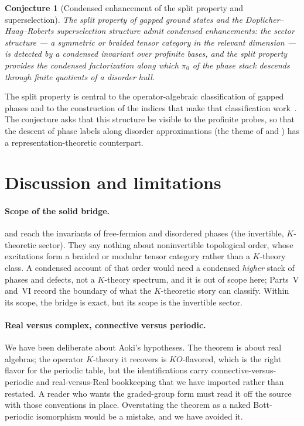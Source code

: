 \documentclass[12pt]{article}
\theoremstyle{plain}
\newtheorem{conjecture}{Conjecture}
\begin{document}
\begin{conjecture}[Condensed enhancement of the split property and superselection]
\label{conj:split}
The split property of gapped ground states and the
Doplicher--Haag--Roberts superselection structure admit condensed enhancements: the
sector structure --- a symmetric or braided tensor category in the relevant
dimension --- is detected by a condensed invariant over profinite bases, and the
split property provides the condensed factorization along which $\pi_{0}$ of the
phase stack descends through finite quotients of a disorder hull.
\end{conjecture}

\noindent The split property is central to the operator-algebraic classification of
gapped phases and to the construction of the indices that make that classification
work~\cite{ogata-classification-review,ogata-h3-index}. The conjecture asks that this
structure be visible to the profinite probes, so that the descent of phase labels
along disorder approximations (the theme of  and
) has a representation-theoretic counterpart.

\section{Discussion and limitations}
\label{sec:discussion}

\paragraph{Scope of the solid bridge.}
 and  reach the invariants of free-fermion
and disordered phases (the invertible, $K$-theoretic sector). They say nothing
about noninvertible topological order, whose excitations form a braided or modular
tensor category rather than a $K$-theory class. A condensed account of that order
would need a condensed \emph{higher} stack of phases and defects, not a $K$-theory
spectrum, and it is out of scope here; Parts~V and~VI record the boundary of what the
$K$-theoretic story can classify. Within its scope, the bridge is exact, but its
scope is the invertible sector.

\paragraph{Real versus complex, connective versus periodic.}
We have been deliberate about Aoki's hypotheses. The theorem is about real algebras;
the operator $K$-theory it recovers is $KO$-flavored, which is the right flavor for
the periodic table, but the identifications carry connective-versus-periodic and
real-versus-Real bookkeeping that we have imported rather than restated. A reader who
wants the graded-group form must read it off the source with those conventions in
place. Overstating the theorem as a naked Bott-periodic isomorphism would be a
mistake, and we have avoided it.
\end{document}
